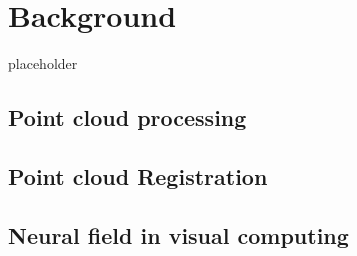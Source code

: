 
\chapter{Background}
\label{chap:background}

placeholder

\section{Point cloud processing}


\section{Point cloud Registration}

\section{Neural field in visual computing}

